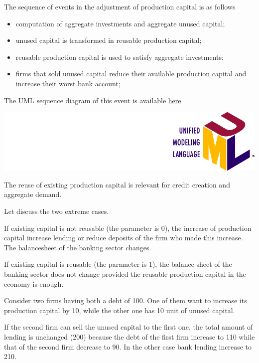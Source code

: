 \documentclass{book}
\newcommand{\doclocation}{file:///Users/giulioni/Documents/workspace/gabriele/docs}
\begin{document}
The sequence of events in the adjustment of production capital is as follows
\begin{itemize}
	\item computation of aggregate investments and aggregate unused capital;
	\item unused capital is transformed in reusable production capital;
	\item reusable production capital is used to satisfy aggregate investments;
	\item firms that sold unused capital reduce their available production capital and increase their worst bank account;
\end{itemize}

\vskip3mm
The UML sequence diagram of this event is available \href{\doclocation/umldoc/adjustProductionCapitalAndBankAccount.html}{here}
\begin{marginfigure}
	\includegraphics[scale=0.1]{uml.png}
\end{marginfigure}



The reuse of existing production capital is relevant for credit creation and aggregate demand.

Let discuss the two extreme cases.

If existing capital is not reusable (the parameter is 0), the increase of production capital increase lending or reduce deposits of the firm who made this increase. The balancesheet of the banking sector changes

If existing capital is reusable (the parameter is 1), the balance sheet of the banking sector does not change provided the reusable production capital in the economy is enough.

Consider two firms having both a debt of 100. One of them want to increase its production capital by 10, while the other one has 10 unit of unused capital. 

If the second firm can sell the unused capital to the first one, the total amount of lending is unchanged (200) because the debt of the first firm increase to 110 while that of the second firm decrease to 90.
In the other case bank lending increase to 210.
\end{document}
